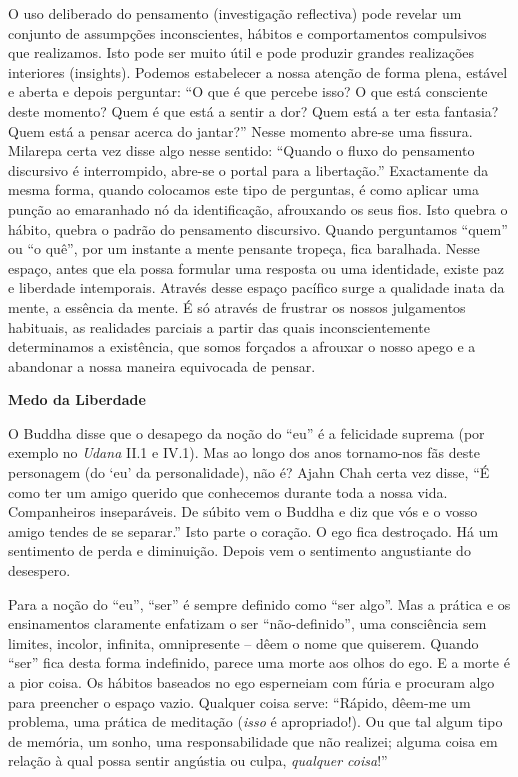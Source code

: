 O uso deliberado do pensamento (investigação reflectiva) pode revelar um
conjunto de assumpções inconscientes, hábitos e comportamentos
compulsivos que realizamos. Isto pode ser muito útil e pode produzir
grandes realizações interiores (insights). Podemos estabelecer a nossa
atenção de forma plena, estável e aberta e depois perguntar: ``O que é
que percebe isso? O que está consciente deste momento? Quem é que está a
sentir a dor? Quem está a ter esta fantasia? Quem está a pensar acerca
do jantar?'' Nesse momento abre-se uma fissura. Milarepa certa vez disse
algo nesse sentido: ``Quando o fluxo do pensamento discursivo é
interrompido, abre-se o portal para a libertação.'' Exactamente da mesma
forma, quando colocamos este tipo de perguntas, é como aplicar uma
punção ao emaranhado nó da identificação, afrouxando os seus fios. Isto
quebra o hábito, quebra o padrão do pensamento discursivo. Quando
perguntamos ``quem'' ou ``o quê'', por um instante a mente pensante
tropeça, fica baralhada. Nesse espaço, antes que ela possa formular uma
resposta ou uma identidade, existe paz e liberdade intemporais. Através
desse espaço pacífico surge a qualidade inata da mente, a essência da
mente. É só através de frustrar os nossos julgamentos habituais, as
realidades parciais a partir das quais inconscientemente determinamos a
existência, que somos forçados a afrouxar o nosso apego e a abandonar a
nossa maneira equivocada de pensar.

\textbf{Medo da Liberdade}

O Buddha disse que o desapego da noção do ``eu'' é a felicidade suprema
(por exemplo no \emph{Udana} II.1 e IV.1). Mas ao longo dos anos
tornamo-nos fãs deste personagem (do `eu' da personalidade), não é?
Ajahn Chah certa vez disse, ``É como ter um amigo querido que conhecemos
durante toda a nossa vida. Companheiros inseparáveis. De súbito vem o
Buddha e diz que vós e o vosso amigo tendes de se separar.'' Isto parte
o coração. O ego fica destroçado. Há um sentimento de perda e
diminuição. Depois vem o sentimento angustiante do desespero.

Para a noção do ``eu'', ``ser'' é sempre definido como ``ser algo''. Mas
a prática e os ensinamentos claramente enfatizam o ser ``não-definido'',
uma consciência sem limites, incolor, infinita, omnipresente -- dêem o
nome que quiserem. Quando ``ser'' fica desta forma indefinido, parece
uma morte aos olhos do ego. E a morte é a pior coisa. Os hábitos
baseados no ego esperneiam com fúria e procuram algo para preencher o
espaço vazio. Qualquer coisa serve: ``Rápido, dêem-me um problema, uma
prática de meditação (\emph{isso} é apropriado!). Ou que tal algum tipo
de memória, um sonho, uma responsabilidade que não realizei; alguma
coisa em relação à qual possa sentir angústia ou culpa, \emph{qualquer
coisa}!''

